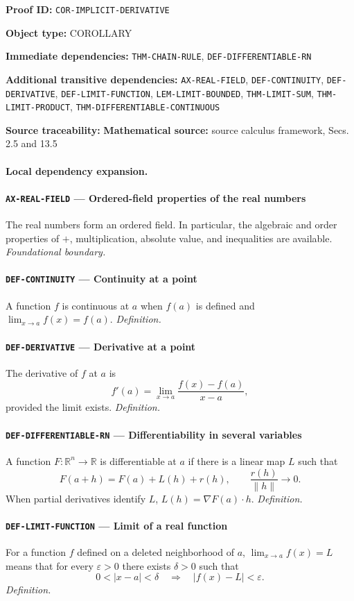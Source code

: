 \documentclass[10pt]{article}
\newcommand{\pidraw}[1]{\begingroup\urlstyle{tt}\nolinkurl{#1}\endgroup}
\theoremstyle{definition}
\theoremstyle{remark}
\newcommand{\meta}[2]{\noindent\textbf{#1:} #2\par}
\begin{document}
\meta{Proof ID}{\pidraw{COR-IMPLICIT-DERIVATIVE}}
\meta{Object type}{COROLLARY}
\meta{Immediate dependencies}{\pidraw{THM-CHAIN-RULE}, \pidraw{DEF-DIFFERENTIABLE-RN}}
\meta{Additional transitive dependencies}{\pidraw{AX-REAL-FIELD}, \pidraw{DEF-CONTINUITY}, \pidraw{DEF-DERIVATIVE}, \pidraw{DEF-LIMIT-FUNCTION}, \pidraw{LEM-LIMIT-BOUNDED}, \pidraw{THM-LIMIT-SUM}, \pidraw{THM-LIMIT-PRODUCT}, \pidraw{THM-DIFFERENTIABLE-CONTINUOUS}}
\meta{Source traceability}{\textbf{Mathematical source:} source calculus framework, Secs. 2.5 and 13.5}

\paragraph{Local dependency expansion.}

\paragraph{\pidraw{AX-REAL-FIELD} --- Ordered-field properties of the real numbers}
The real numbers form an ordered field. In particular, the algebraic and order properties of $+$, multiplication, absolute value, and inequalities are available.
\textit{Foundational boundary.}

\paragraph{\pidraw{DEF-CONTINUITY} --- Continuity at a point}
A function $f$ is continuous at $a$ when $f(a)$ is defined and $\lim_{x\to a}f(x)=f(a)$.
\textit{Definition.}

\paragraph{\pidraw{DEF-DERIVATIVE} --- Derivative at a point}
The derivative of $f$ at $a$ is
\[
f'(a)=\lim_{x\to a}\frac{f(x)-f(a)}{x-a},
\]
provided the limit exists.
\textit{Definition.}

\paragraph{\pidraw{DEF-DIFFERENTIABLE-RN} --- Differentiability in several variables}
A function $F:\mathbb{R}^n\to\mathbb{R}$ is differentiable at $a$ if there is a linear map $L$ such that
\[
F(a+h)=F(a)+L(h)+r(h),\qquad \frac{r(h)}{\|h\|}\to0.
\]
When partial derivatives identify $L$, $L(h)=\nabla F(a)\cdot h$.
\textit{Definition.}

\paragraph{\pidraw{DEF-LIMIT-FUNCTION} --- Limit of a real function}
For a function $f$ defined on a deleted neighborhood of $a$, $\lim_{x\to a}f(x)=L$ means that for every $\varepsilon>0$ there exists $\delta>0$ such that
\[
0<|x-a|<\delta\quad\Longrightarrow\quad |f(x)-L|<\varepsilon.
\]
\textit{Definition.}
\end{document}
